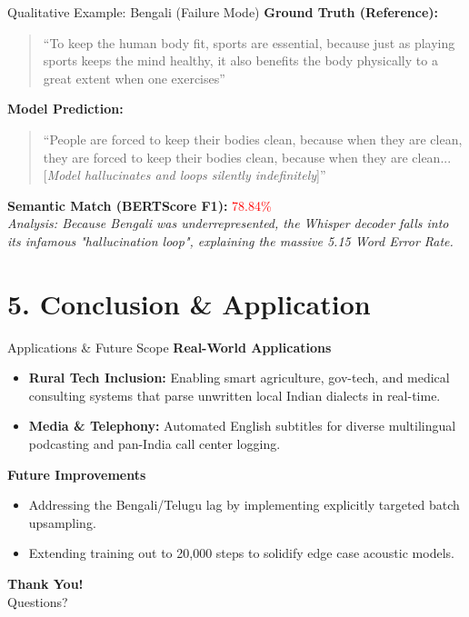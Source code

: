 \documentclass[aspectratio=169]{beamer}
\begin{document}
\begin{frame}{Qualitative Example: Bengali (Failure Mode)}
    \textbf{Ground Truth (Reference):}
    \begin{quote}
    ``To keep the human body fit, sports are essential, because just as playing sports keeps the mind healthy, it also benefits the body physically to a great extent when one exercises''
    \end{quote}
    
    \textbf{Model Prediction:}
    \begin{quote}
    ``People are forced to keep their bodies clean, because when they are clean, they are forced to keep their bodies clean, because when they are clean... [\textit{Model hallucinates and loops silently indefinitely}]''
    \end{quote}
    
    \vspace{0.3cm}
    \textbf{Semantic Match (BERTScore F1):} \textcolor{red}{78.84\%} \\
    \small \textit{Analysis: Because Bengali was underrepresented, the Whisper decoder falls into its infamous "hallucination loop", explaining the massive 5.15 Word Error Rate.}
\end{frame}

\section{5. Conclusion \& Application}
\begin{frame}{Applications \& Future Scope}
    \textbf{Real-World Applications}
    \begin{itemize}
        \item \textbf{Rural Tech Inclusion:} Enabling smart agriculture, gov-tech, and medical consulting systems that parse unwritten local Indian dialects in real-time.
        \item \textbf{Media \& Telephony:} Automated English subtitles for diverse multilingual podcasting and pan-India call center logging.
    \end{itemize}
    
    \vspace{0.3cm}
    \textbf{Future Improvements}
    \begin{itemize}
        \item Addressing the Bengali/Telugu lag by implementing explicitly targeted batch upsampling.
        \item Extending training out to 20,000 steps to solidify edge case acoustic models.
    \end{itemize}
\end{frame}

\begin{frame}
    \centering
    \Huge \textbf{Thank You!}\\
    \vspace{0.5cm}
    \large Questions?
\end{frame}
\end{document}
